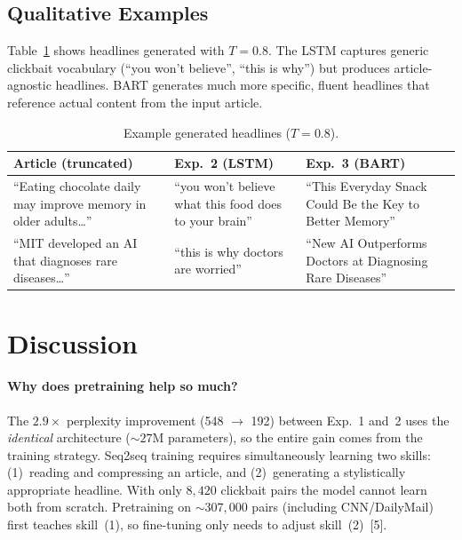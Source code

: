 \documentclass{article}
\begin{document}
\subsection{Qualitative Examples}

Table~\ref{tab:examples} shows headlines generated with $T{=}0.8$.
The LSTM captures generic clickbait vocabulary (``you won't believe'', ``this is why'') but produces article-agnostic headlines.
BART generates much more specific, fluent headlines that reference actual content from the input article.

\begin{table}[ht]
  \caption{Example generated headlines ($T = 0.8$).}
  \label{tab:examples}
  \centering
  \small
  \begin{tabular}{p{4.2cm}p{3.8cm}p{4.2cm}}
    \toprule
    Article (truncated) & Exp.~2 (LSTM) & Exp.~3 (BART) \\
    \midrule
    ``Eating chocolate daily may improve memory in older adults\ldots'' & ``you won't believe what this food does to your brain'' & ``This Everyday Snack Could Be the Key to Better Memory'' \\
    \addlinespace
    ``MIT developed an AI that diagnoses rare diseases\ldots'' & ``this is why doctors are worried'' & ``New AI Outperforms Doctors at Diagnosing Rare Diseases'' \\
    \bottomrule
  \end{tabular}
\end{table}


\section{Discussion}

\paragraph{Why does pretraining help so much?}
The $2.9\times$ perplexity improvement (548 $\rightarrow$ 192) between Exp.~1 and~2 uses the \emph{identical} architecture (${\sim}27$M parameters), so the entire gain comes from the training strategy.
Seq2seq training requires simultaneously learning two skills: (1)~reading and compressing an article, and (2)~generating a stylistically appropriate headline.
With only $8{,}420$ clickbait pairs the model cannot learn both from scratch.
Pretraining on ${\sim}307{,}000$ pairs (including CNN/DailyMail) first teaches skill~(1), so fine-tuning only needs to adjust skill~(2)~[5].
\end{document}

